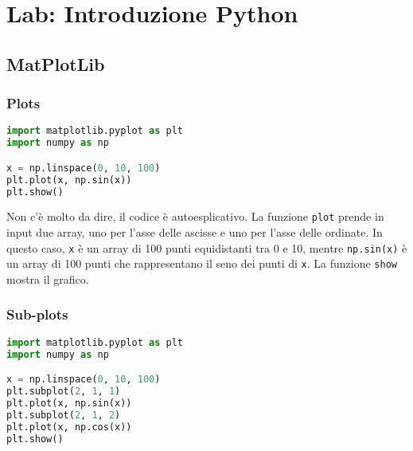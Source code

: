 \section{Lab: Introduzione Python}
\subsection{MatPlotLib}

\subsubsection{Plots}

\begin{lstlisting}[language=Python]
import matplotlib.pyplot as plt
import numpy as np

x = np.linspace(0, 10, 100)
plt.plot(x, np.sin(x))
plt.show()
\end{lstlisting}

Non c'è molto da dire, il codice è autoesplicativo. La funzione \texttt{plot}
prende in input due array, uno per l'asse delle ascisse e uno per l'asse delle
ordinate. In questo caso, \texttt{x} è un array di 100 punti equidistanti tra 0
e 10, mentre \texttt{np.sin(x)} è un array di 100 punti che rappresentano il
seno dei punti di \texttt{x}. La funzione \texttt{show} mostra il grafico.



\subsubsection{Sub-plots}

\begin{lstlisting}[language=Python]
import matplotlib.pyplot as plt
import numpy as np

x = np.linspace(0, 10, 100)
plt.subplot(2, 1, 1)
plt.plot(x, np.sin(x))
plt.subplot(2, 1, 2)
plt.plot(x, np.cos(x))
plt.show()

\end{lstlisting}

